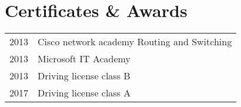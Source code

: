 \documentclass[a4paper,final]{deedy-resume}%
\begin{document}
\begin{minipage}[t]{0.66\textwidth}
	\sectionspace %


	\section{Certificates \& Awards}

	\begin{tabular}{rl}
		2013 & Cisco network academy Routing and Switching 	\\
		2013 & Microsoft IT Academy 						\\
		2013 & Driving license class B                     	\\
		2017 & Driving license class A
	\end{tabular}


\end{minipage} %








\end{document}
